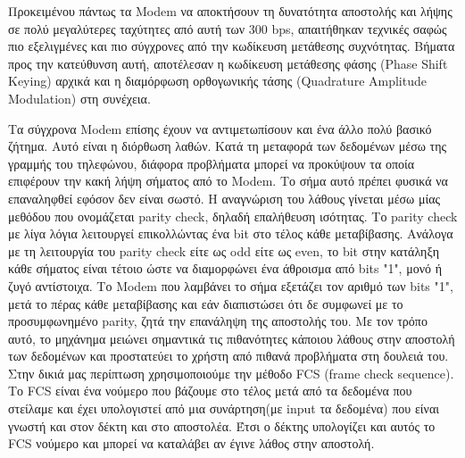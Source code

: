 \documentclass{article}
\begin{document}
Προκειμένου πάντως τα Modem να αποκτήσουν τη δυνατότητα αποστολής και λήψης σε
πολύ μεγαλύτερες ταχύτητες από αυτή των 300 bps, απαιτήθηκαν τεχνικές σαφώς πιο
εξελιγμένες και πιο σύγχρονες  από  την  κωδίκευση  μετάθεσης  συχνότητας.
Βήματα  προς  την  κατεύθυνση  αυτή, αποτέλεσαν η κωδίκευση μετάθεσης φάσης
(Phase Shift Keying) αρχικά και η διαμόρφωση ορθογωνικής τάσης (Quadrature
Amplitude Modulation) στη συνέχεια.


Τα σύγχρονα Modem επίσης έχουν να αντιμετωπίσουν και ένα άλλο πολύ βασικό
ζήτημα. Αυτό είναι η  διόρθωση  λαθών.  Κατά  τη  μεταφορά  των  δεδομένων  μέσω
της  γραμμής  του  τηλεφώνου, διάφορα προβλήματα μπορεί να προκύψουν τα οποία
επιφέρουν την κακή λήψη σήματος από το Modem. Το σήμα αυτό πρέπει φυσικά να
επαναληφθεί εφόσον δεν είναι σωστό. Η αναγνώριση του λάθους γίνεται μέσω μίας
μεθόδου που ονομάζεται parity check, δηλαδή επαλήθευση ισότητας. Το parity check
με λίγα λόγια λειτουργεί επικολλώντας  ένα  bit  στο  τέλος  κάθε  μεταβίβασης.
Ανάλογα με τη λειτουργία του parity check είτε ως odd είτε ως even, το bit στην
κατάληξη κάθε σήματος είναι τέτοιο ώστε να διαμορφώνει ένα άθροισμα από bits
"1", μονό ή ζυγό αντίστοιχα. Το Modem που λαμβάνει το σήμα εξετάζει τον αριθμό
των bits "1", μετά το πέρας κάθε μεταβίβασης και εάν διαπιστώσει ότι δε συμφωνεί
με το προσυμφωνημένο parity,  ζητά  την  επανάληψη  της  αποστολής  του. Με τον
τρόπο αυτό, το μηχάνημα μειώνει σημαντικά τις πιθανότητες κάποιου λάθους στην
αποστολή των δεδομένων και προστατεύει το χρήστη από πιθανά προβλήματα στη
δουλειά του. Στην δικιά μας περίπτωση χρησιμοποιούμε την μέθοδο FCS (frame check
sequence). Το FCS είναι ένα νούμερο που βάζουμε στο τέλος μετά από τα δεδομένα
που στείλαμε και έχει υπολογιστεί από μια συνάρτηση(με input τα δεδομένα) που
είναι γνωστή και στον δέκτη και στο αποστολέα. Έτσι ο δέκτης υπολογίζει και
αυτός το FCS νούμερο και μπορεί να καταλάβει αν έγινε λάθος στην αποστολή.
\end{document}

